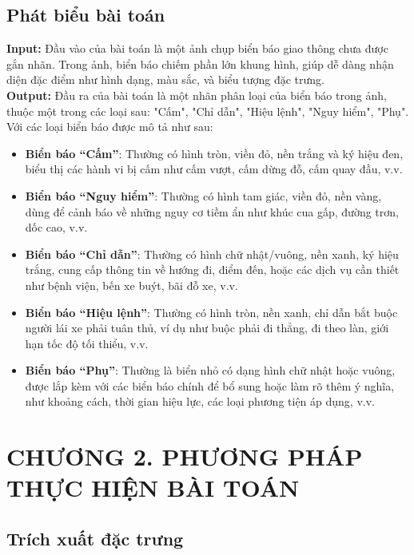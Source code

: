 \documentclass[a4paper,12pt]{article}
\begin{document}
\subsection{Phát biểu bài toán}
\textbf{Input:} Đầu vào của bài toán là một ảnh chụp biển báo giao thông chưa được gắn nhãn. Trong ảnh, biển báo chiếm phần lớn khung hình, giúp dễ dàng nhận diện đặc điểm như hình dạng, màu sắc, và biểu tượng đặc trưng.\\[0.2cm]
\textbf{Output:} Đầu ra của bài toán là một nhãn phân loại của biển báo trong ảnh, thuộc một trong các loại sau: "Cấm", "Chỉ dẫn", "Hiệu lệnh", "Nguy hiểm", "Phụ".\\[0.2cm]
Với các loại biển báo được mô tả như sau:
\begin{itemize}
    \item \textbf{Biển báo “Cấm”}: Thường có hình tròn, viền đỏ, nền trắng và ký hiệu đen, biểu thị các hành vi bị cấm như cấm vượt, cấm dừng đỗ, cấm quay đầu, v.v.
    \item \textbf{Biển báo “Nguy hiểm”}: Thường có hình tam giác, viền đỏ, nền vàng, dùng để cảnh báo về những nguy cơ tiềm ẩn như khúc cua gấp, đường trơn, dốc cao, v.v.
    \item \textbf{Biển báo “Chỉ dẫn”}: Thường có hình chữ nhật/vuông, nền xanh, ký hiệu trắng, cung cấp thông tin về hướng đi, điểm đến, hoặc các dịch vụ cần thiết như bệnh viện, bến xe buýt, bãi đỗ xe, v.v.
    \item \textbf{Biển báo “Hiệu lệnh”}: Thường có hình tròn, nền xanh, chỉ dẫn bắt buộc người lái xe phải tuân thủ, ví dụ như buộc phải đi thẳng, đi theo làn, giới hạn tốc độ tối thiểu, v.v.
    \item \textbf{Biển báo “Phụ”}: Thường là biển nhỏ có dạng hình chữ nhật hoặc vuông, được lắp kèm với các biển báo chính để bổ sung hoặc làm rõ thêm ý nghĩa, như khoảng cách, thời gian hiệu lực, các loại phương tiện áp dụng, v.v.
\end{itemize}

\newpage
\section*{\centering CHƯƠNG 2. PHƯƠNG PHÁP THỰC HIỆN BÀI TOÁN}
\vspace{1cm}
\setcounter{section}{2}
\setcounter{subsection}{0}
\subsection{Trích xuất đặc trưng}
\end{document}
